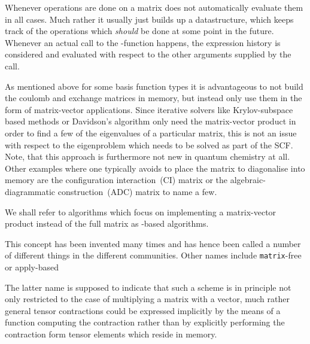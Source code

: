 \label{sec:lazymat}

Whenever operations are done on a matrix \lazyten does not automatically
evaluate them in all cases.
Much rather it usually just builds up a datastructure,
which keeps track of the operations which \textit{should} be done
at some point in the future.
Whenever an actual call to the \contraction-function happens,
the expression history is considered and evaluated with respect
to the other arguments supplied by the \contraction call.



As mentioned above for some basis function types it is advantageous
to not build the coulomb and exchange matrices in memory,
but instead only use them in the form of matrix-vector applications.
Since iterative solvers like Krylov-subspace based methods or Davidson's algorithm
only need the matrix-vector product in order to find a few of the eigenvalues
of a particular matrix,
this is not an issue with respect to the eigenproblem which needs to be solved
as part of the SCF.
Note, that this approach is furthermore not new in quantum chemistry at all.
Other examples where one typically avoids to place the matrix to diagonalise
into memory are the configuration interaction~(CI) matrix
or the algebraic-diagrammatic construction~(ADC) matrix to name a few.

We shall refer to algorithms which focus on implementing a matrix-vector product
instead of the full matrix as \contraction-based algorithms.

This concept has been invented many times
and has hence been called a number of different things
in the different communities.
Other names include \texttt{matrix}-free
or apply-based


The latter name is supposed to indicate that such a scheme is in principle
not only restricted to the case of multiplying a matrix with a vector,
much rather general tensor contractions could be expressed implicitly
by the means of a function computing the contraction rather than
by explicitly performing the contraction form tensor elements
which reside in memory.

